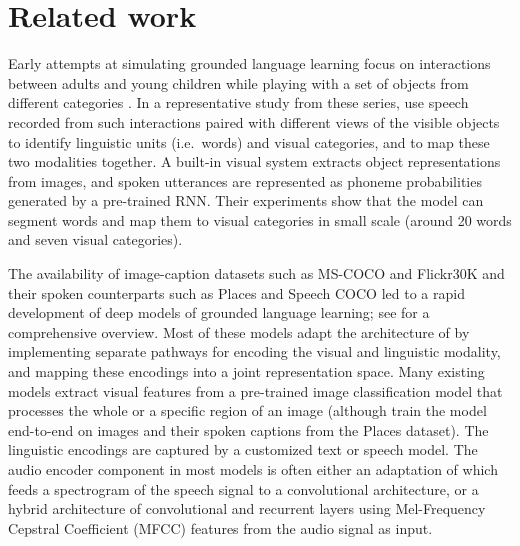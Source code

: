\section{Related work}
\label{sec:related}

Early attempts at simulating grounded language learning focus on interactions between adults and young children while playing with a set of objects from different categories \cite{roy1999learning, roy2000grounded, roy2000learning, roy2002learning, gorniak2003visually, mukherjee2003visual}. In a representative study from these series, \citet{roy2002learning} use speech recorded from such interactions paired with different views of the visible objects to identify linguistic units (i.e.\ words) and visual categories, and to map these two modalities together. A built-in visual system extracts object representations from images, and spoken utterances are represented as phoneme probabilities generated by a pre-trained RNN. Their experiments show that the model can segment words and map them to visual categories in small scale (around 20 words and seven visual categories).

The availability of image-caption datasets such as MS-COCO \cite{lin2014microsoft} and Flickr30K \cite{plummer2015flickr30k} and their spoken counterparts such as Places \cite{zhou2014learning} and Speech COCO \cite{speech_coco} led to a rapid development of deep models of grounded language learning; see \citet{chrupala-visually-2021} for a comprehensive overview. Most of these models adapt the architecture of \citet{karpathy2014deep} by implementing separate pathways for encoding the visual and linguistic modality, and mapping these encodings into a joint representation space. Many existing models extract visual features from a pre-trained image classification model that processes the whole or a specific region of an image (although \citet{harwath2018jointly} train the model end-to-end on images and their spoken captions from the Places dataset). The linguistic encodings are captured by a customized text or speech model.  The audio encoder component in most models is often either an adaptation of \citet{harwath2016unsupervised} which feeds a spectrogram of the speech signal to a convolutional architecture, or a hybrid architecture of convolutional and recurrent layers using  Mel-Frequency Cepstral Coefficient (MFCC) features from the audio signal as input.


